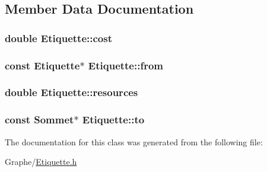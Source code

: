\subsection{Member Data Documentation}
\hypertarget{class_etiquette_adb966761f009b397b8c70bcfed7f1c8c}{
\subsubsection[{cost}]{\setlength{\rightskip}{0pt plus 5cm}double Etiquette\+::cost}}\label{class_etiquette_adb966761f009b397b8c70bcfed7f1c8c}
\hypertarget{class_etiquette_a18f4af505c332fe206d08598f6471e46}{
\subsubsection[{from}]{\setlength{\rightskip}{0pt plus 5cm}const {\bf Etiquette}$\ast$ Etiquette\+::from}}\label{class_etiquette_a18f4af505c332fe206d08598f6471e46}
\hypertarget{class_etiquette_a12d2960b9e33da5ff3b0e1352bd1e4b2}{
\subsubsection[{resources}]{\setlength{\rightskip}{0pt plus 5cm}double Etiquette\+::resources}}\label{class_etiquette_a12d2960b9e33da5ff3b0e1352bd1e4b2}
\hypertarget{class_etiquette_a8bd5882f6591338a62df5e5239103594}{
\subsubsection[{to}]{\setlength{\rightskip}{0pt plus 5cm}const {\bf Sommet}$\ast$ Etiquette\+::to}}\label{class_etiquette_a8bd5882f6591338a62df5e5239103594}


The documentation for this class was generated from the following file\+:\begin{DoxyCompactItemize}
\item 
Graphe/\hyperlink{_etiquette_8h}{Etiquette.\+h}\end{DoxyCompactItemize}

